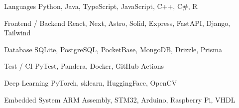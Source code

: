 

\begin{cvskills}

  \cvskill
    {Languages} %
    {Python, Java, TypeScript, JavaScript, C++, C\#, R} %

  \cvskill
    {Frontend / Backend} %
    {React, Next, Astro, Solid, Express, FastAPI, Django, Tailwind} %

  \cvskill
    {Database} %
    {SQLite, PostgreSQL, PocketBase, MongoDB, Drizzle, Prisma} %

  \cvskill
    {Test / CI} %
    {PyTest, Pandera, Docker, GitHub Actions} %

  \cvskill
    {Deep Learning} %
    {PyTorch, sklearn, HuggingFace, OpenCV} %

  \cvskill
    {Embedded System} %
    {ARM Assembly, STM32, Arduino, Raspberry Pi, VHDL} %


\end{cvskills}
